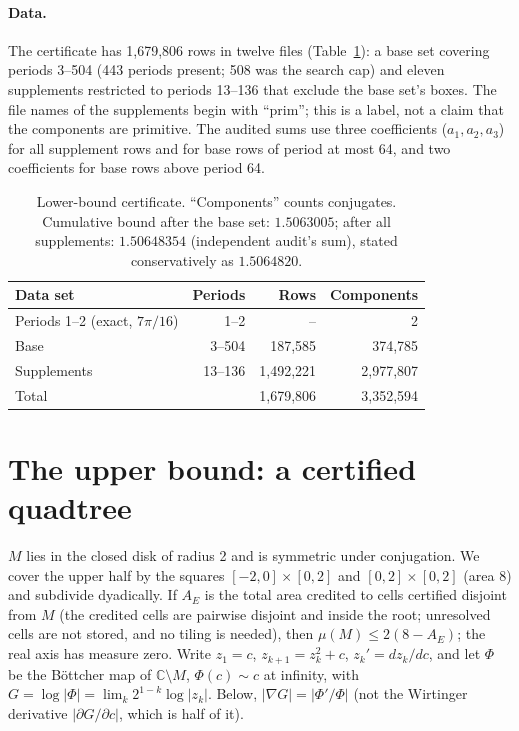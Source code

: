\documentclass[11pt]{article}
\begin{document}
\paragraph{Data.} The certificate has 1,679,806 rows in twelve files (Table~\ref{tab:lb}): a base set covering periods 3--504 (443 periods present; 508 was the search cap) and eleven supplements restricted to periods 13--136 that exclude the base set's boxes. The file names of the supplements begin with ``prim''; this is a label, not a claim that the components are primitive. The audited sums use three coefficients ($a_1,a_2,a_3$) for all supplement rows and for base rows of period at most 64, and two coefficients for base rows above period 64.

\begin{table}[h]
\centering
\begin{tabular}{@{}lrrr@{}}
\toprule
Data set & Periods & Rows & Components \\
\midrule
Periods 1--2 (exact, $7\pi/16$) & 1--2 & -- & 2 \\
Base & 3--504 & 187,585 & 374,785 \\
Supplements & 13--136 & 1,492,221 & 2,977,807 \\
\midrule
Total & & 1,679,806 & 3,352,594 \\
\bottomrule
\end{tabular}
\caption{Lower-bound certificate. ``Components'' counts conjugates. Cumulative bound after the base set: $1.5063005$; after all supplements: $1.50648354$ (independent audit's sum), stated conservatively as $1.5064820$.}
\label{tab:lb}
\end{table}

\section{The upper bound: a certified quadtree}

$M$ lies in the closed disk of radius 2 and is symmetric under conjugation. We cover the upper half by the squares $[-2,0]\times[0,2]$ and $[0,2]\times[0,2]$ (area 8) and subdivide dyadically. If $A_E$ is the total area credited to cells certified disjoint from $M$ (the credited cells are pairwise disjoint and inside the root; unresolved cells are not stored, and no tiling is needed), then $\mu(M)\le2(8-A_E)$; the real axis has measure zero. Write $z_1=c$, $z_{k+1}=z_k^2+c$, $z_k'=dz_k/dc$, and let $\Phi$ be the B\"ottcher map of $\mathbb{C}\setminus M$, $\Phi(c)\sim c$ at infinity, with $G=\log|\Phi|=\lim_k2^{1-k}\log|z_k|$. Below, $|\nabla G|=|\Phi'/\Phi|$ (not the Wirtinger derivative $|\partial G/\partial c|$, which is half of it).
\end{document}
